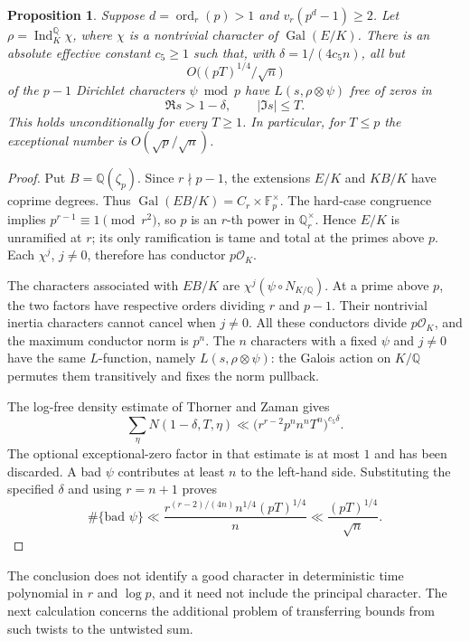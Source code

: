 \documentclass[11pt]{article}
\newtheorem{proposition}[theorem]{Proposition}
\theoremstyle{definition}
\theoremstyle{remark}
\begin{document}
\begin{proposition}\label{prop:p-specific-twist-pool}
Suppose \(d=\operatorname{ord}_r(p)>1\) and
\(v_r(p^d-1)\geq2\). Let
\(\rho=\operatorname{Ind}_{K}^{\mathbb Q}\chi\), where \(\chi\)
is a nontrivial character of \(\operatorname{Gal}(E/K)\).
There is an absolute effective constant \(c_5\geq1\) such that,
with \(\delta=1/(4c_5n)\), all but
\[
 O\bigl((pT)^{1/4}/\sqrt n\bigr)
\]
of the \(p-1\) Dirichlet characters \(\psi\bmod p\) have
\(L(s,\rho\otimes\psi)\) free of zeros in
\[
 \Re s>1-\delta,\qquad |\Im s|\leq T.
\]
This holds unconditionally for every \(T\geq1\).
In particular, for \(T\leq p\) the exceptional number is
\(O(\sqrt p/\sqrt n)\).
\end{proposition}
\begin{proof}
Put \(B=\mathbb Q(\zeta_p)\). Since \(r\nmid p-1\), the extensions
\(E/K\) and \(KB/K\) have coprime degrees. Thus
\(\operatorname{Gal}(EB/K)=C_r\times\mathbb F_p^\times\).
The hard-case congruence implies
\(p^{r-1}\equiv1\pmod{r^2}\), so \(p\) is an \(r\)-th power
in \(\mathbb Q_r^\times\). Hence \(E/K\) is unramified at \(r\);
its only ramification is tame and total at the primes above \(p\).
Each \(\chi^j\), \(j\ne0\), therefore has conductor \(p\mathcal O_K\).

The characters associated with \(EB/K\) are
\(\chi^j(\psi\circ N_{K/\mathbb Q})\).
At a prime above \(p\), the two factors have respective orders
dividing \(r\) and \(p-1\). Their nontrivial inertia characters
cannot cancel when \(j\ne0\). All these conductors divide
\(p\mathcal O_K\), and the maximum conductor norm is \(p^n\).
The \(n\) characters with a fixed \(\psi\) and \(j\ne0\)
have the same \(L\)-function, namely \(L(s,\rho\otimes\psi)\):
the Galois action on \(K/\mathbb Q\) permutes them transitively
and fixes the norm pullback.

The log-free density estimate of Thorner and Zaman
\citep[Theorem~3.2, printed p.~1051; equation~(3-1), p.~1050]
{ThornerZaman2019} gives
\[
 \sum_\eta N(1-\delta,T,\eta)
 \ll
 \bigl(r^{r-2}p^n n^n T^n\bigr)^{c_5\delta}.
\]
The optional exceptional-zero factor in that estimate is at most
\(1\) and has been discarded. A bad \(\psi\) contributes at least
\(n\) to the left-hand side. Substituting the specified \(\delta\)
and using \(r=n+1\) proves
\[
 \#\{\text{bad }\psi\}
 \ll \frac{r^{(r-2)/(4n)}n^{1/4}(pT)^{1/4}}{n}
 \ll \frac{(pT)^{1/4}}{\sqrt n}.
\]
\end{proof}

The conclusion does not identify a good character in deterministic
time polynomial in \(r\) and \(\log p\), and it need not include
the principal character. The next calculation concerns the additional
problem of transferring bounds from such twists to the untwisted sum.
\end{document}
